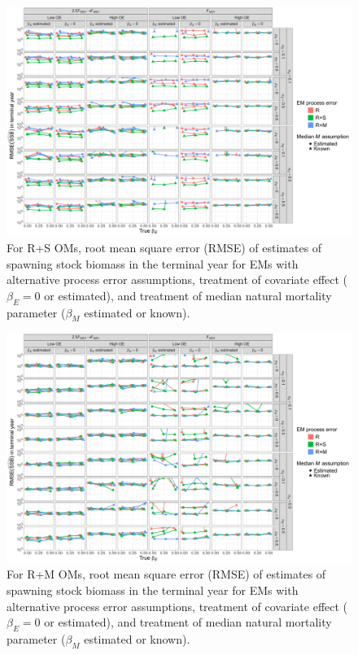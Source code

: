\documentclass[
  12pt,
]{article}
\begin{document}
\begin{landscape}
\begin{figure}
\begin{center}
\includegraphics[height = \textheight]{terminal_year_ssb_rmse_RSom}
\end{center}
\caption{For R+S OMs, root mean square error (RMSE) of estimates of spawning stock biomass in the terminal year for EMs with alternative process error assumptions, treatment of covariate effect ($\beta_E = 0$ or estimated), and treatment of median natural mortality parameter ($\beta_M$ estimated or known).}\label{terminal_ssb_rmse_RSom}
\end{figure}
\end{landscape}

\begin{landscape}
\begin{figure}
\begin{center}
\includegraphics[height = \textheight]{terminal_year_ssb_rmse_RMom}
\end{center}
\caption{For R+M OMs, root mean square error (RMSE) of estimates of spawning stock biomass in the terminal year for EMs with alternative process error assumptions, treatment of covariate effect ($\beta_E = 0$ or estimated), and treatment of median natural mortality parameter ($\beta_M$ estimated or known).}\label{terminal_ssb_rmse_RMom}
\end{figure}
\end{landscape}
\end{document}
